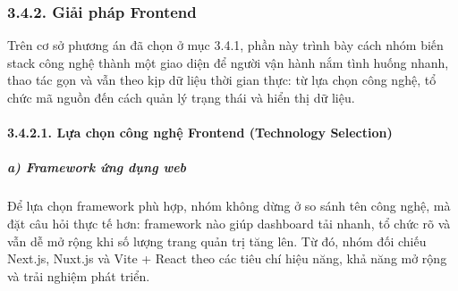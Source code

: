 \documentclass[a4paper]{extarticle}
\begin{document}
\subsubsection{3.4.2. Giải pháp
Frontend}\label{324-giux1ea3i-phuxe1p-frontend}

Trên cơ sở phương án đã chọn ở mục 3.4.1, phần này trình bày cách nhóm
biến stack công nghệ thành một giao diện để người vận hành nắm tình
huống nhanh, thao tác gọn và vẫn theo kịp dữ liệu thời gian thực: từ lựa
chọn công nghệ, tổ chức mã nguồn đến cách quản lý trạng thái và hiển thị
dữ liệu.

\paragraph{3.4.2.1. Lựa chọn công nghệ Frontend (Technology
Selection)}\label{3241-lux1ef1a-chux1ecdn-cuxf4ng-nghux1ec7-frontend-technology-selection}

\subparagraph{a) Framework ứng dụng
web}\label{a-framework-ux1ee9ng-dux1ee5ng-web}

Để lựa chọn framework phù hợp, nhóm không dừng ở so sánh tên công nghệ,
mà đặt câu hỏi thực tế hơn: framework nào giúp dashboard tải nhanh, tổ
chức rõ và vẫn dễ mở rộng khi số lượng trang quản trị tăng lên. Từ đó,
nhóm đối chiếu Next.js, Nuxt.js và Vite + React theo các tiêu chí hiệu
năng, khả năng mở rộng và trải nghiệm phát triển.
\end{document}
